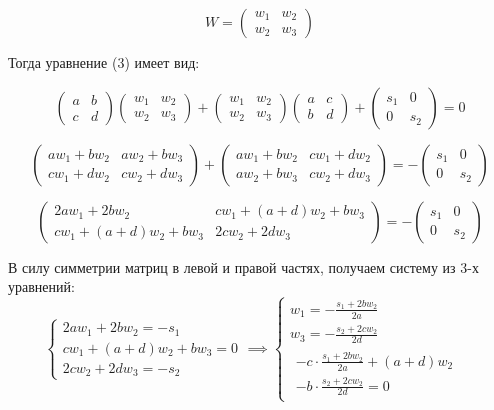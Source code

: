 \documentclass[17pt]{article}
\begin{document}
$$
W = 
\begin{pmatrix}
    w_1 & w_2 \\
    w_2 & w_3
\end{pmatrix}
$$

Тогда уравнение (3) имеет вид:

$$
\begin{pmatrix}
    a & b \\
    c & d
\end{pmatrix}
\begin{pmatrix}
    w_1 & w_2 \\
    w_2 & w_3
\end{pmatrix}
+
\begin{pmatrix}
    w_1 & w_2 \\
    w_2 & w_3
\end{pmatrix}
\begin{pmatrix}
    a & c \\
    b & d
\end{pmatrix}
+
\begin{pmatrix}
    s_1 & 0 \\
    0 & s_2
\end{pmatrix}
= 0
$$

$$
\begin{pmatrix}
    a w_1 + b w_2 & a w_2 + b w_3 \\
    c w_1 + d w_2 & c w_2 + d w_3
\end{pmatrix}
+
\begin{pmatrix}
    a w_1 + b w_2 & c w_1 + d w_2 \\
    a w_2 + b w_3 & c w_2 + d w_3
\end{pmatrix}
=
- \begin{pmatrix}
    s_1 & 0 \\
    0 & s_2
\end{pmatrix}
$$

$$
\begin{pmatrix}
    2a w_1 + 2b w_2 & cw_1 + (a+d)w_2 + bw_3 \\
    cw_1 + (a+d)w_2 + bw_3 & 2c w_2 + 2d w_3
\end{pmatrix}
=
- \begin{pmatrix}
    s_1 & 0 \\
    0 & s_2
\end{pmatrix}
$$

В силу симметрии матриц в левой и правой частях, получаем систему из 3-х уравнений:
$$
\begin{cases}
   2a w_1 + 2b w_2 = -s_1 \\
   c w_1 + (a+d) w_2 + b w_3 = 0 \\
   2c w_2 + 2d w_3 = -s_2
\end{cases}
\implies
\begin{cases}
    w_1 = -\frac{s_1 + 2b w_2}{2a} \\
    w_3 = -\frac{s_2 + 2c w_2}{2d} \\
    \begin{aligned}
        -c \cdot \frac{s_1 + 2b w_2}{2a} + (a + d) w_2 & \\
        - b \cdot \frac{s_2 + 2c w_2}{2d} = 0
    \end{aligned}
\end{cases}
$$
\end{document}
